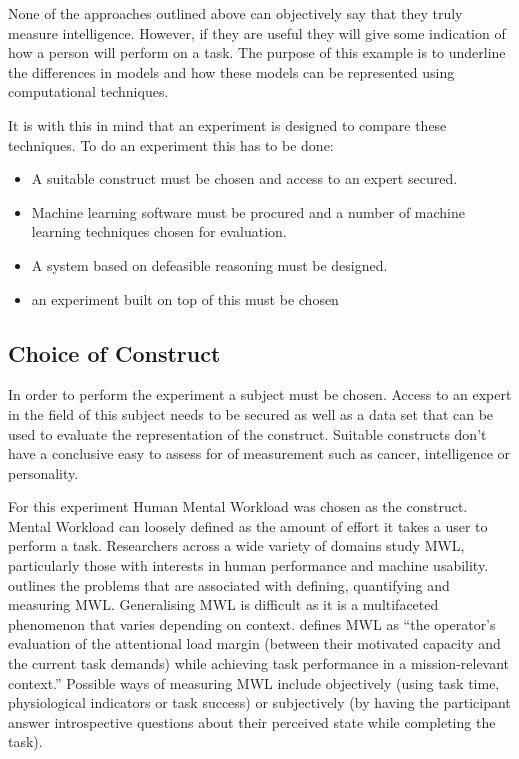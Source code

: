 None of the approaches outlined above can objectively say that they truly measure intelligence. However, if they are useful they will give some indication of how a person will perform on a task. The purpose of this example is to underline the differences in models and how these models can be represented using computational techniques.

It is with this in mind that an experiment is designed to compare these techniques. To do an experiment this has to be done:

\begin{itemize}

  \item A suitable construct must be chosen and access to an expert secured.
  \item Machine learning software must be procured and a number of machine learning techniques chosen for evaluation.
  \item A system based on defeasible reasoning must be designed.
  \item an experiment built on top of this must be chosen 
  
\end{itemize}

\subsection{Choice of Construct}

In order to perform the experiment a subject must be chosen. Access to an expert in the field of this subject needs to be secured as well as a data set that can be used to evaluate the representation of the construct. Suitable constructs don't have a conclusive easy to assess for of measurement such as  cancer, intelligence or personality. 

For this experiment Human Mental Workload was chosen as the construct. Mental Workload can loosely defined as the amount of effort it takes a user to perform a task. Researchers across a wide variety of domains study MWL, particularly those with interests in human performance and machine usability. \cite{meshkati2011human} outlines the problems that are associated with defining, quantifying and measuring MWL. Generalising MWL is difficult as it is a multifaceted phenomenon that varies depending on context. \cite{meshkati2011human} defines MWL as ``the operator's evaluation of the attentional load margin (between their motivated capacity and the current task demands) while achieving task performance in a mission-relevant context.'' Possible ways of measuring MWL include objectively (using task time, physiological indicators or task success) or subjectively (by having the participant answer introspective questions about their perceived state while completing the task).

